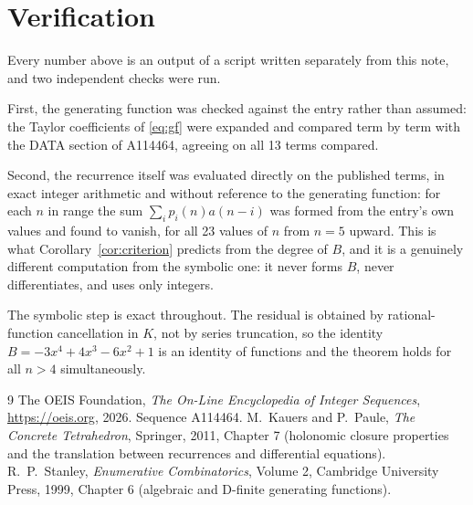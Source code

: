 \documentclass[11pt,a4paper]{article}
\theoremstyle{plain}
\theoremstyle{definition}
\begin{document}
\section{Verification}

Every number above is an output of a script written separately from this note, and two
independent checks were run.

First, the generating function was checked against the entry rather than assumed: the
Taylor coefficients of \eqref{eq:gf} were expanded and compared term by term with the DATA
section of A114464, agreeing on all 13 terms compared.

Second, the recurrence itself was evaluated directly on the published terms, in exact
integer arithmetic and without reference to the generating function: for each $n$ in range
the sum $\sum_{i}p_{i}(n)a(n-i)$ was formed from the entry's own values and found to
vanish, for all 23 values of $n$ from $n=5$ upward. This is what
Corollary~\ref{cor:criterion} predicts from the degree of $B$, and it is a genuinely
different computation from the symbolic one: it never forms $B$, never differentiates, and
uses only integers.

The symbolic step is exact throughout. The residual is obtained by rational-function
cancellation in $K$, not by series truncation, so the identity $B=- 3 x^{4} + 4 x^{3} - 6 x^{2} + 1$ is an
identity of functions and the theorem holds for all $n>4$ simultaneously.

\begin{thebibliography}{9}
 The OEIS Foundation, \emph{The On-Line Encyclopedia of Integer Sequences},
\url{https://oeis.org}, 2026. Sequence A114464.
 M.~Kauers and P.~Paule, \emph{The Concrete Tetrahedron}, Springer, 2011,
Chapter 7 (holonomic closure properties and the translation between recurrences and
differential equations).
 R.~P.~Stanley, \emph{Enumerative Combinatorics}, Volume 2, Cambridge
University Press, 1999, Chapter 6 (algebraic and D-finite generating functions).
\end{thebibliography}
\end{document}
